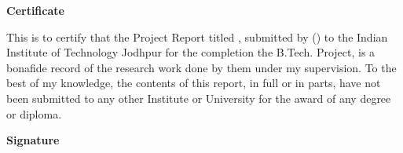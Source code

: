 \begin{flushright}
\huge{\textbf{Certificate}}
\end{flushright}
This is to certify that the Project Report titled \ttitle{}, submitted by \authorname{}(\rn{}) to the Indian Institute of Technology Jodhpur for the completion the B.Tech. Project, is a bonafide record of the research work done by them under my supervision. To the best of my knowledge, the contents of this report, in full or in parts, have not been submitted to any other Institute or University for the award of any degree or diploma.
\vspace{2cm}
\begin{flushright}
\large{\textbf{Signature}}\\
\supname\\
\end{flushright}